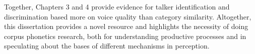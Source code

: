 Together, Chapters 3 and 4 provide evidence for talker identification and discrimination based more on voice quality than category similarity. Altogether, this dissertation provides a novel resource and highlights the necessity of doing corpus phonetics research, both for understanding productive processes and in speculating about the bases of different mechanisms in perception. 


\endinput %
